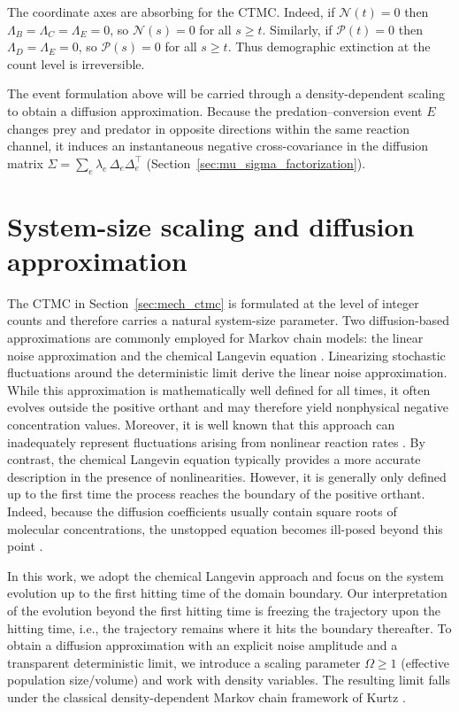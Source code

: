 \documentclass[pdflatex,sn-mathphys-ay]{sn-jnl}
\theoremstyle{thmstyleone}
\theoremstyle{definition}
\theoremstyle{remark}
\begin{document}
The coordinate axes are absorbing for the CTMC. Indeed, if $\mathcal N(t)=0$ then
$\Lambda_B=\Lambda_C=\Lambda_E=0$, so $\mathcal N(s)=0$ for all $s\ge t$. Similarly, if $\mathcal P(t)=0$ then
$\Lambda_D=\Lambda_E=0$, so $\mathcal P(s)=0$ for all $s\ge t$. Thus demographic extinction at the count level is
irreversible.

The event formulation above will be carried through a density-dependent scaling to obtain a diffusion approximation.
Because the predation--conversion event $E$ changes prey and predator in opposite directions within the same
reaction channel, it induces an instantaneous negative cross-covariance in the diffusion matrix
$\Sigma=\sum_e \lambda_e\,\Delta_e\Delta_e^\top$ (Section~\ref{sec:mu_sigma_factorization}).

\section{System-size scaling and diffusion approximation}
\label{sec:scaling_diffusion}

The CTMC in Section~\ref{sec:mech_ctmc} is formulated at the level of integer counts and therefore carries a natural system-size parameter. 
Two diffusion-based approximations are commonly employed for Markov chain models: the linear noise approximation \citep{kampen_power_1961,kampen_stochastic_2007} and the chemical Langevin equation \citep{gillespie_chemical_2000,gillespie_chemical_2002,kurtz_strong_1978}. Linearizing stochastic fluctuations around the deterministic limit derive the linear noise approximation. While this approximation is mathematically well defined for all times, it often evolves outside the positive orthant and may therefore yield nonphysical negative concentration values. Moreover, it is well known that this approach can inadequately represent fluctuations arising from nonlinear reaction rates \citep{wallace_linear_2012}. By contrast, the chemical Langevin equation typically provides a more accurate description in the presence of nonlinearities. However, it is generally only defined up to the first time the process reaches the boundary of the positive orthant. Indeed, because the diffusion coefficients usually contain square roots of molecular concentrations, the unstopped equation becomes ill-posed beyond this point \citep{manninen_developing_2006,szpruch_comparing_2010,wilkie_positivity_2008}.

In this work, we adopt the chemical Langevin approach and focus on the system evolution up to the first hitting time of the domain boundary. Our interpretation of the evolution beyond the first hitting time is freezing the trajectory upon the hitting time, i.e., the trajectory remains where it hits the boundary thereafter. To obtain a diffusion approximation with an explicit noise amplitude and a transparent
deterministic limit, we introduce a scaling parameter $\Omega\ge 1$ (effective population size/volume) and work with density variables. 
The resulting limit falls under the classical density-dependent Markov chain framework of Kurtz \citep{kurtz_solutions_1970,kurtz_limit_1971,kurtz_limit_1976,ethier_markov_1986}.
\end{document}
